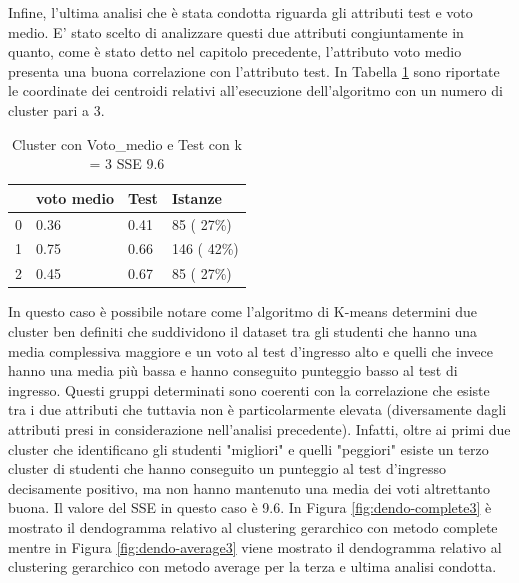 \documentclass[12pt]{article}
\begin{document}
Infine, l'ultima analisi che è stata condotta riguarda gli attributi test e voto medio. E' stato scelto di analizzare 
questi due attributi congiuntamente in quanto, come è stato detto nel capitolo precedente, l'attributo voto medio 
presenta una buona correlazione con l'attributo test. 
In Tabella \ref{c3MT} sono riportate le coordinate dei centroidi relativi all'esecuzione dell'algoritmo con un numero di cluster pari a 3.
\begin{table}[ht]
	\centering
	\begin{tabular}{@{}llll@{}}
	\toprule
	  & voto medio & Test  & Istanze\\ \midrule
	0 & 0.36       & 0.41  & 85  ( 27\%)\\
	1 & 0.75       & 0.66  & 146 ( 42\%)\\
	2 & 0.45       & 0.67  & 85  ( 27\%)\\ \bottomrule
	\end{tabular}
	\caption{Cluster con Voto\_medio e Test con k = 3 SSE 9.6}
	\label{c3MT}
\end{table}
In questo caso è possibile notare come
l'algoritmo di K-means determini due cluster ben definiti che suddividono il dataset tra gli studenti che hanno una
media complessiva maggiore e un voto al test d'ingresso alto e quelli che invece hanno una media più bassa e 
hanno conseguito punteggio basso al test di ingresso. Questi gruppi determinati sono coerenti con la correlazione 
che esiste tra i due attributi che tuttavia non è particolarmente elevata (diversamente dagli attributi presi in 
considerazione nell'analisi precedente). Infatti, oltre ai primi due cluster che identificano gli studenti "migliori"
e quelli "peggiori" esiste un terzo cluster di studenti che hanno conseguito un punteggio al test d'ingresso decisamente
positivo, ma non hanno mantenuto una media dei voti altrettanto buona. Il valore del SSE in questo caso è 9.6. In Figura \ref{fig:dendo-complete3} è mostrato il dendogramma relativo al clustering gerarchico con metodo complete mentre in Figura \ref{fig:dendo-average3} viene mostrato il dendogramma relativo al clustering gerarchico con metodo average per la terza e ultima analisi condotta.
\end{document}
